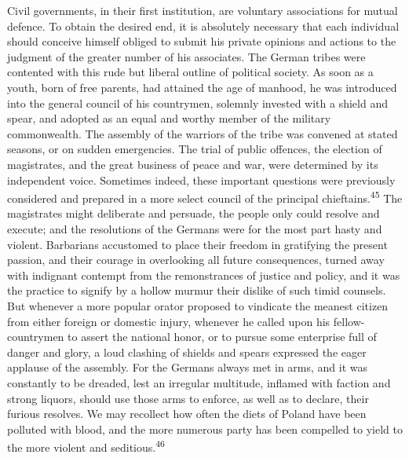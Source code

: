 


Civil governments, in their first institution, are voluntary
associations for mutual defence. To obtain the desired end, it is
absolutely necessary that each individual should conceive himself
obliged to submit his private opinions and actions to the
judgment of the greater number of his associates. The German
tribes were contented with this rude but liberal outline of
political society. As soon as a youth, born of free parents, had
attained the age of manhood, he was introduced into the general
council of his countrymen, solemnly invested with a shield and
spear, and adopted as an equal and worthy member of the military
commonwealth. The assembly of the warriors of the tribe was
convened at stated seasons, or on sudden emergencies. The trial
of public offences, the election of magistrates, and the great
business of peace and war, were determined by its independent
voice. Sometimes indeed, these important questions were
previously considered and prepared in a more select council of
the principal chieftains.\textsuperscript{45} The magistrates might deliberate and
persuade, the people only could resolve and execute; and the
resolutions of the Germans were for the most part hasty and
violent. Barbarians accustomed to place their freedom in
gratifying the present passion, and their courage in overlooking
all future consequences, turned away with indignant contempt from
the remonstrances of justice and policy, and it was the practice
to signify by a hollow murmur their dislike of such timid
counsels. But whenever a more popular orator proposed to
vindicate the meanest citizen from either foreign or domestic
injury, whenever he called upon his fellow-countrymen to assert
the national honor, or to pursue some enterprise full of danger
and glory, a loud clashing of shields and spears expressed the
eager applause of the assembly. For the Germans always met in
arms, and it was constantly to be dreaded, lest an irregular
multitude, inflamed with faction and strong liquors, should use
those arms to enforce, as well as to declare, their furious
resolves. We may recollect how often the diets of Poland have
been polluted with blood, and the more numerous party has been
compelled to yield to the more violent and seditious.\textsuperscript{46}

